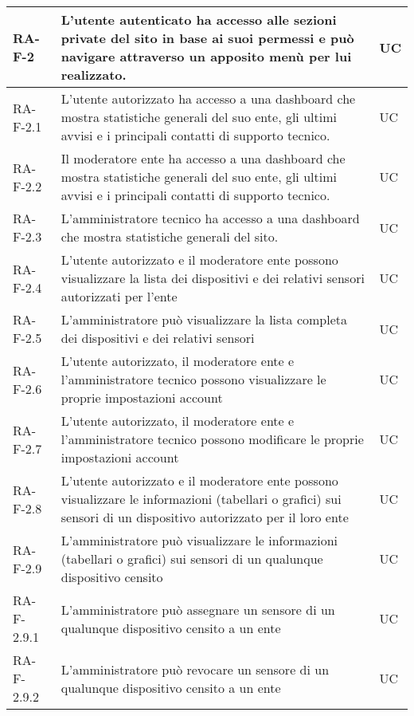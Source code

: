 \begin{center}
\begin{longtable}{|p{3cm}|p{9.85cm}|p{2cm}|}
		\rowcolor{redroundrobin}
		\textbf{RA-F-2} & L'utente autenticato ha accesso alle sezioni private del sito in base ai suoi permessi e può navigare attraverso un apposito menù per lui realizzato. & UC \\ \hline 
		
		{\color{gray} RA-F-}2.1 & L'utente autorizzato ha accesso a una dashboard che mostra statistiche generali del suo ente, gli ultimi avvisi e i principali contatti di supporto tecnico. & UC \\ \hline
		{\color{gray} RA-F-}2.2 & Il moderatore ente ha accesso a una dashboard che mostra statistiche generali del suo ente, gli ultimi avvisi e i principali contatti di supporto tecnico. & UC \\ \hline
		{\color{gray} RA-F-}2.3 & L'amministratore tecnico ha accesso a una dashboard che mostra statistiche generali del sito. & UC \\ \hline
		
		{\color{gray} RA-F-}2.4 & L'utente autorizzato e il moderatore ente possono visualizzare la lista dei dispositivi e dei relativi sensori autorizzati per l'ente & UC \\ \hline
		{\color{gray} RA-F-}2.5 & L'amministratore può visualizzare la lista completa dei dispositivi e dei relativi sensori & UC \\ \hline

		{\color{gray} RA-F-}2.6 & L'utente autorizzato, il moderatore ente e l'amministratore tecnico possono visualizzare le proprie impostazioni account & UC \\ \hline
		{\color{gray} RA-F-}2.7 & L'utente autorizzato, il moderatore ente e l'amministratore tecnico possono modificare le proprie impostazioni account & UC \\ \hline
		
		{\color{gray} RA-F-}2.8 & L'utente autorizzato e il moderatore ente possono visualizzare le informazioni (tabellari o grafici) sui sensori di un dispositivo autorizzato per il loro ente & UC \\ \hline
		{\color{gray} RA-F-}2.9 & L'amministratore può visualizzare le informazioni (tabellari o grafici) sui sensori di un qualunque dispositivo censito & UC \\ \hline
		{\color{gray} RA-F-}2.9.1 & L'amministratore può assegnare un sensore di un qualunque dispositivo censito a un ente & UC \\ \hline
		{\color{gray} RA-F-}2.9.2 & L'amministratore può revocare un sensore di un qualunque dispositivo censito a un ente & UC \\ \hline


\end{longtable}
\end{center}
